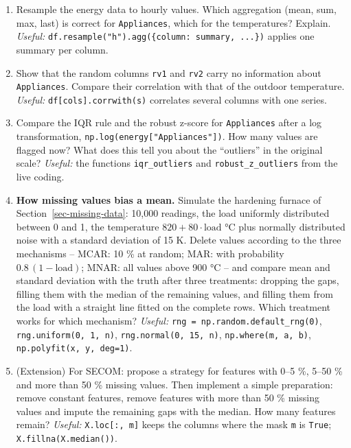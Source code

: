 \documentclass[
  letterpaper,
  DIV=11,
  numbers=noendperiod]{scrreprt}
\begin{document}
\begin{enumerate}
  \emph{Useful:}
  \texttt{pd.read\_csv(f,\ sep=";",\ na\_values={[}-999{]})},
  \texttt{pd.to\_datetime(s.astype(str),\ format="\%Y\%m\%d\%H")},
  \texttt{df.tz\_localize("UTC").tz\_convert("Europe/Berlin")}. To use a
  station near your home town, look it up in the
  \href{https://opendata.dwd.de/climate_environment/CDC/observations_germany/climate/hourly/air_temperature/recent/TU_Stundenwerte_Beschreibung_Stationen.txt}{station
  list}.
\item
  Resample the energy data to hourly values. Which aggregation (mean,
  sum, max, last) is correct for \texttt{Appliances}, which for the
  temperatures? Explain. \emph{Useful:}
  \texttt{df.resample("h").agg(\{column:\ summary,\ ...\})} applies one
  summary per column.
\item
  Show that the random columns \texttt{rv1} and \texttt{rv2} carry no
  information about \texttt{Appliances}. Compare their correlation with
  that of the outdoor temperature. \emph{Useful:}
  \texttt{df{[}cols{]}.corrwith(s)} correlates several columns with one
  series.
\item
  Compare the IQR rule and the robust z-score for \texttt{Appliances}
  after a log transformation, \texttt{np.log(energy{[}"Appliances"{]})}.
  How many values are flagged now? What does this tell you about the
  ``outliers'' in the original scale? \emph{Useful:} the functions
  \texttt{iqr\_outliers} and \texttt{robust\_z\_outliers} from the live
  coding.
\item
  \textbf{How missing values bias a mean.} Simulate the hardening
  furnace of Section~\ref{sec-missing-data}: 10,000 readings, the load
  uniformly distributed between 0 and 1, the temperature
  \(820 + 80 \cdot \text{load}\) °C plus normally distributed noise with
  a standard deviation of 15 K. Delete values according to the three
  mechanisms -- MCAR: 10 \% at random; MAR: with probability
  \(0.8\,(1 - \text{load})\); MNAR: all values above 900 °C -- and
  compare mean and standard deviation with the truth after three
  treatments: dropping the gaps, filling them with the median of the
  remaining values, and filling them from the load with a straight line
  fitted on the complete rows. Which treatment works for which
  mechanism? \emph{Useful:} \texttt{rng\ =\ np.random.default\_rng(0)},
  \texttt{rng.uniform(0,\ 1,\ n)}, \texttt{rng.normal(0,\ 15,\ n)},
  \texttt{np.where(m,\ a,\ b)}, \texttt{np.polyfit(x,\ y,\ deg=1)}.
\item
  (Extension) For SECOM: propose a strategy for features with 0--5 \%,
  5--50 \% and more than 50 \% missing values. Then implement a simple
  preparation: remove constant features, remove features with more than
  50 \% missing values and impute the remaining gaps with the median.
  How many features remain? \emph{Useful:} \texttt{X.loc{[}:,\ m{]}}
  keeps the columns where the mask \texttt{m} is \texttt{True};
  \texttt{X.fillna(X.median())}.
\end{enumerate}
\end{document}
